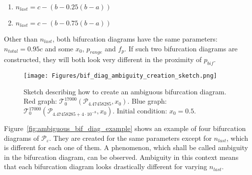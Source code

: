 \begin{enumerate}
    \item $n_{last} = c-(b-0.25(b-a))$
    \item $n_{last} = c-(b-0.75(b-a))$
\end{enumerate}

Other than $n_{last}$, both bifurcation diagrams have the same parameters: $n_{total} = 0.95c$ and some $x_0$, $p_{range}$ and $f_{p}$.
If such two bifurcation diagrams are constructed, they will both look very different in the proximity of $p_{bif}$.

\begin{figure}[!h]
    \centering
    \texttt{[image: Figures/bif\_diag\_ambiguity\_creation\_sketch.png]}
    \caption{
        Sketch describing how to create an ambiguous bifurcation diagram. 
        Red graph: $\mathcal{T}^{17000}_{0}(\mathcal{P}_{4.47458285}, x_0)$. 
        Blue graph: $\mathcal{T}^{17000}_{0}(\mathcal{P}_{4.47458285+4 \cdot 10^{-8}}, x_0)$. 
        Initial condition: $x_0 = 0.5$.
    }
    \label{fig:ambiguous_bif_diag}
\end{figure}

\par
Figure~\ref{fig:ambiguous_bif_diag_example} shows an example of four bifurcation diagrams of $\mathcal{P}_{\varepsilon}$.
They are created for the same parameters except for $n_{last}$, which is different for each one of them.
A phenomenon, which shall be called ambiguity in the bifurcation diagram, can be observed.
Ambiguity in this context means that each bifurcation diagram looks drastically different for varying $n_{last}$.

